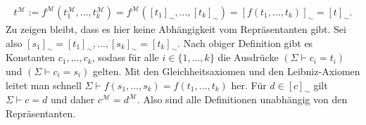 \begin{solution}
\begin{align*}
t^\mathscr{M} := f^\mathscr{M}(t_1^\mathscr{M}, \dots, t_k^\mathscr{M}) = f^\mathscr{M}([t_1]_\sim, \dots, [t_k]_\sim) = [f(t_1, \dots, t_k)]_\sim = [t]_\sim.
\end{align*} 
Zu zeigen bleibt, dass es hier keine Abhängigkeit vom Repräsentanten gibt. Sei also $[s_1]_\sim = [t_1]_\sim, \dots, [s_k]_\sim = [t_k]_\sim$. Nach obiger Definition gibt es Konstanten $c_1,\dots,c_k$, sodass für alle $i \in \{1, \dots, k\}$ die Ausdrücke
$(\Sigma \vdash c_i  = t_i)$ und $(\Sigma \vdash c_i  = s_i)$ gelten. Mit den Gleichheitsaxiomen und den Leibniz-Axiomen leitet man schnell $\Sigma \vdash f(s_1,\dots,s_k) = f(t_1,\dots,t_k)$ her. Für $d \in [c]_\sim$ gilt $\Sigma \vdash c = d$ und daher $c^\mathscr{M} = d^\mathscr{M}$. Also sind alle Definitionen unabhängig von den Repräsentanten.
\end{solution}

